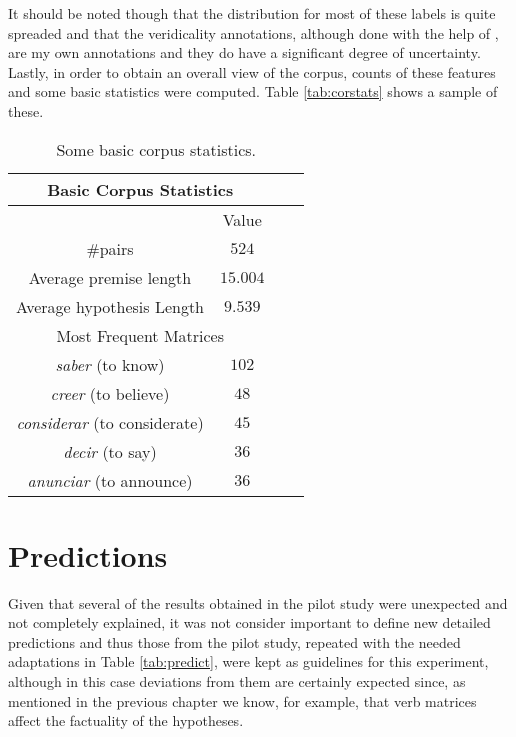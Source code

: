 It should be noted though that the distribution for most of these labels is quite spreaded and that the veridicality annotations, although done with the help of \citet{stanlex2012}, are my own annotations and they do have a significant degree of uncertainty. Lastly, in order to obtain an overall view of the corpus, counts of these features and some basic statistics were computed. Table \ref{tab:corstats} shows a sample of these.\\


\begin{table}
\centering
\begin{tabular}{|c|c|c|c|}
\hline
\multicolumn{2}{|c|}{Basic Corpus Statistics}\\\hline
                      & Value\\\hline 
\#pairs & $524$ \\\hline
Average premise length &$15.004$\\\hline
Average hypothesis Length & $9.539$\\\hline
\multicolumn{2}{|c|}{Most Frequent Matrices}\\\hline
\textit{saber} (to know)  & $102$\\\hline
\textit{creer} (to believe) & $48$\\\hline
\textit{considerar} (to considerate) & $45$\\\hline
\textit{decir}  (to say) & $36$\\\hline
\textit{anunciar} (to announce) & $36$\\\hline
\end{tabular}
\caption{Some basic corpus statistics.}\label{tab:corstats}
\label{tab:basstats}
\end{table}

\section{Predictions}
\label{sect:pred}
Given that several of the results obtained in the pilot study were unexpected and not completely explained, it was not consider important to define new detailed predictions and thus those from the pilot study, repeated with the needed adaptations in Table \ref{tab:predict}, were kept as guidelines for this experiment, although in this case deviations from them are certainly expected since, as mentioned in the previous chapter we know, for example, that verb matrices affect the factuality of the hypotheses.\\ 

